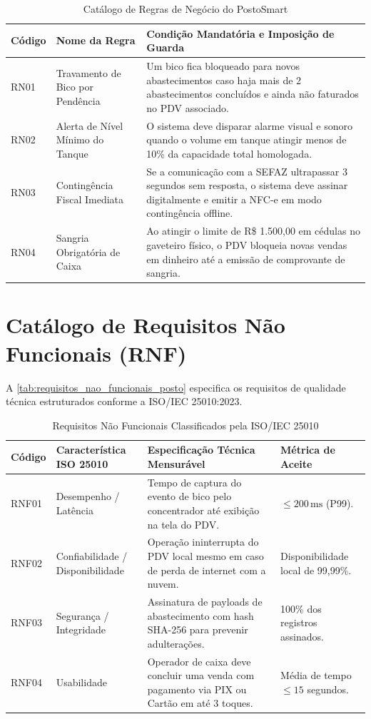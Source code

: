 \begin{table}[htbp]
\caption{Catálogo de Regras de Negócio do PostoSmart}
\label{tab:regras_negocio_posto}
\centering
\small
\begin{tabularx}{\textwidth}{@{} l l Y @{}}
\toprule
\textbf{Código} & \textbf{Nome da Regra} & \textbf{Condição Mandatória e Imposição de Guarda} \\
\midrule
RN01 & Travamento de Bico por Pendência & Um bico fica bloqueado para novos abastecimentos caso haja mais de 2 abastecimentos concluídos e ainda não faturados no PDV associado. \\
RN02 & Alerta de Nível Mínimo do Tanque & O sistema deve disparar alarme visual e sonoro quando o volume em tanque atingir menos de 10\% da capacidade total homologada. \\
RN03 & Contingência Fiscal Imediata & Se a comunicação com a SEFAZ ultrapassar 3 segundos sem resposta, o sistema deve assinar digitalmente e emitir a NFC-e em modo contingência offline. \\
RN04 & Sangria Obrigatória de Caixa & Ao atingir o limite de R\$ 1.500,00 em cédulas no gaveteiro físico, o PDV bloqueia novas vendas em dinheiro até a emissão de comprovante de sangria. \\
\bottomrule
\end{tabularx}
\end{table}

\section{Catálogo de Requisitos Não Funcionais (RNF)}

A \autoref{tab:requisitos_nao_funcionais_posto} especifica os requisitos de qualidade técnica estruturados conforme a ISO/IEC 25010:2023.

\begin{table}[htbp]
\caption{Requisitos Não Funcionais Classificados pela ISO/IEC 25010}
\label{tab:requisitos_nao_funcionais_posto}
\centering
\small
\begin{tabularx}{\textwidth}{@{} l l Y l @{}}
\toprule
\textbf{Código} & \textbf{Característica ISO 25010} & \textbf{Especificação Técnica Mensurável} & \textbf{Métrica de Aceite} \\
\midrule
RNF01 & Desempenho / Latência & Tempo de captura do evento de bico pelo concentrador até exibição na tela do PDV. & $\le 200\,\text{ms}$ (P99). \\
RNF02 & Confiabilidade / Disponibilidade & Operação ininterrupta do PDV local mesmo em caso de perda de internet com a nuvem. & Disponibilidade local de 99,99\%. \\
RNF03 & Segurança / Integridade & Assinatura de payloads de abastecimento com hash SHA-256 para prevenir adulterações. & 100\% dos registros assinados. \\
RNF04 & Usabilidade & Operador de caixa deve concluir uma venda com pagamento via PIX ou Cartão em até 3 toques. & Média de tempo $\le 15$ segundos. \\
\bottomrule
\end{tabularx}
\end{table}
